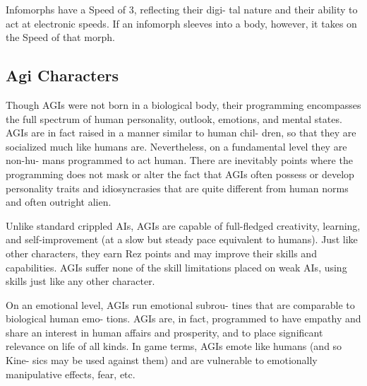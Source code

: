 Infomorphs have a Speed of 3, reflecting their digi-
tal nature and their ability to act at electronic speeds. 
If an infomorph sleeves into a body, however, it takes 
on the Speed of that morph.

\subsection{Agi Characters}

Though AGIs were not born in a biological body, their 
programming encompasses the full spectrum of human 
personality, outlook, emotions, and mental states. AGIs 
are in fact raised in a manner similar to human chil-
dren, so that they are socialized much like humans are. 
Nevertheless, on a fundamental level they are non-hu-
mans programmed to act human. There are inevitably 
points where the programming does not mask or alter 
the fact that AGIs often possess or develop personality 
traits and idiosyncrasies that are quite different from 
human norms and often outright alien.

Unlike standard crippled AIs, AGIs are capable of 
full-fledged creativity, learning, and self-improvement 
(at a slow but steady pace equivalent to humans). Just 
like other characters, they earn Rez points and may 
improve their skills and capabilities. AGIs suffer none 
of the skill limitations placed on weak AIs, using skills 
just like any other character.

On an emotional level, AGIs run emotional subrou-
tines that are comparable to biological human emo-
tions. AGIs are, in fact, programmed to have empathy 
and share an interest in human affairs and prosperity, 
and to place significant relevance on life of all kinds. 
In game terms, AGIs emote like humans (and so Kine-
sics may be used against them) and are vulnerable to 
emotionally manipulative effects, fear, etc.
